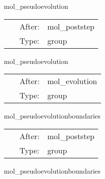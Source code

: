
\hspace{5mm} mol\_pseudoevolution 

\hspace{5mm}{\it calculate pseudo-evolved quantities } 


\hspace{5mm}

 \begin{tabular*}{160mm}{cll} 
~ & After:  & mol\_poststep \\ 
~ & Type:  & group \\ 
\end{tabular*} 


\vspace{5mm}


\hspace{5mm} mol\_pseudoevolution 

\hspace{5mm}{\it calculate pseudo-evolved quantities } 


\hspace{5mm}

 \begin{tabular*}{160mm}{cll} 
~ & After:  & mol\_evolution \\ 
~ & Type:  & group \\ 
\end{tabular*} 


\vspace{5mm}


\hspace{5mm} mol\_pseudoevolutionboundaries 

\hspace{5mm}{\it apply boundary conditions to pseudo-evolved quantities } 


\hspace{5mm}

 \begin{tabular*}{160mm}{cll} 
~ & After:  & mol\_poststep \\ 
~ & Type:  & group \\ 
\end{tabular*} 


\vspace{5mm}


\hspace{5mm} mol\_pseudoevolutionboundaries 

